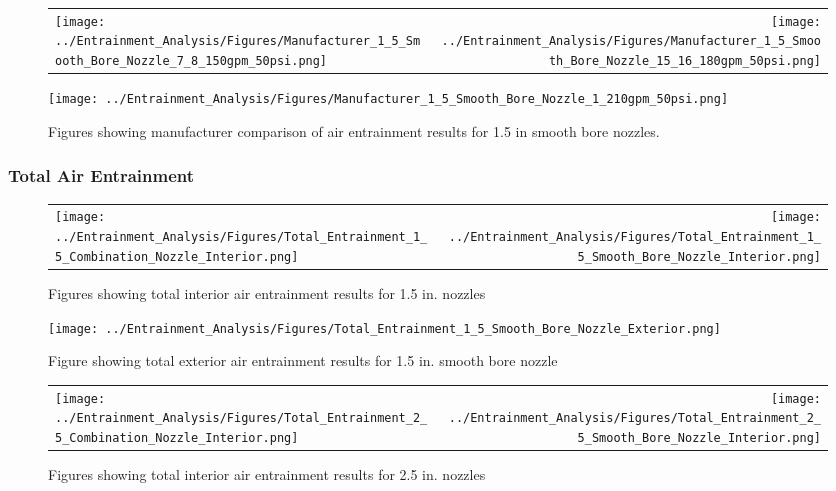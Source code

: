 \documentclass{article}
\begin{document}
\begin{appendices}
\begin{figure}[!ht]
\begin{tabular*}{\textwidth}{lr}
\texttt{[image: ../Entrainment\_Analysis/Figures/Manufacturer\_1\_5\_Smooth\_Bore\_Nozzle\_7\_8\_150gpm\_50psi.png]} &
\texttt{[image: ../Entrainment\_Analysis/Figures/Manufacturer\_1\_5\_Smooth\_Bore\_Nozzle\_15\_16\_180gpm\_50psi.png]} \\
\end{tabular*}
\centering
\texttt{[image: ../Entrainment\_Analysis/Figures/Manufacturer\_1\_5\_Smooth\_Bore\_Nozzle\_1\_210gpm\_50psi.png]} 
\caption{Figures showing manufacturer comparison of air entrainment results for 1.5 in smooth bore nozzles.}
\label{fig:1_5_Interior_Smooth_Bore_Manufacturer}
\end{figure}

\clearpage

\subsubsection{Total Air Entrainment}

\begin{figure}[!ht]
\begin{tabular*}{\textwidth}{lr}
\texttt{[image: ../Entrainment\_Analysis/Figures/Total\_Entrainment\_1\_5\_Combination\_Nozzle\_Interior.png]} &
\texttt{[image: ../Entrainment\_Analysis/Figures/Total\_Entrainment\_1\_5\_Smooth\_Bore\_Nozzle\_Interior.png]} \\
\end{tabular*}
\caption{Figures showing total interior air entrainment results for 1.5 in. nozzles}
\label{fig:1_5_Interior_Total_Entrainment}
\end{figure}

\begin{figure}[!ht]
\centering
\texttt{[image: ../Entrainment\_Analysis/Figures/Total\_Entrainment\_1\_5\_Smooth\_Bore\_Nozzle\_Exterior.png]}
\caption{Figure showing total exterior air entrainment results for 1.5 in. smooth bore nozzle}
\label{fig:1_5_Exterior_Total_Entrainment}
\end{figure}

\clearpage

\begin{figure}[!ht]
\begin{tabular*}{\textwidth}{lr}
\texttt{[image: ../Entrainment\_Analysis/Figures/Total\_Entrainment\_2\_5\_Combination\_Nozzle\_Interior.png]} &
\texttt{[image: ../Entrainment\_Analysis/Figures/Total\_Entrainment\_2\_5\_Smooth\_Bore\_Nozzle\_Interior.png]} \\
\end{tabular*}
\caption{Figures showing total interior air entrainment results for 2.5 in. nozzles}
\label{fig:2_5_Interior_Total_Entrainment}
\end{figure}


\end{appendices}
\end{document}
